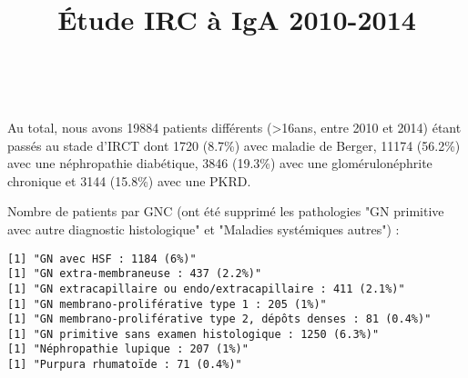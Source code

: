 \documentclass[11pt,a4paper]{article}\usepackage[]{graphicx}\usepackage[]{color}
\title{Étude IRC à IgA 2010-2014}
\makeatletter
\newenvironment{kframe}{%
 \def\at@end@of@kframe{}%
 \ifinner\ifhmode%
  \def\at@end@of@kframe{\end{minipage}}%
  \begin{minipage}{\columnwidth}%
 \fi\fi%
 \def\FrameCommand##1{\hskip\@totalleftmargin \hskip-\fboxsep
 \colorbox{shadecolor}{##1}\hskip-\fboxsep
     \hskip-\linewidth \hskip-\@totalleftmargin \hskip\columnwidth}%
 \MakeFramed {\advance\hsize-\width
   \@totalleftmargin\z@ \linewidth\hsize
   \@setminipage}}%
 {\par\unskip\endMakeFramed%
 \at@end@of@kframe}
\newenvironment{knitrout}{}{} %
\makeatother
\begin{document}
\maketitle

\tableofcontents
~\\





















\begin{knitrout}
\color{fgcolor}\begin{kframe}


{\ttfamily\noindent\bfseries{}}

{\ttfamily\noindent\bfseries{}}\end{kframe}
\end{knitrout}

Au total, nous avons 19884 patients différents (\textgreater 16ans, entre 2010 et 2014) étant passés au stade d'IRCT dont 1720 (8.7\%) avec maladie de Berger, 11174 (56.2\%) avec une néphropathie diabétique, 3846 (19.3\%) avec une glomérulonéphrite chronique et 3144 (15.8\%) avec une PKRD.

Nombre de patients par GNC (ont été supprimé les pathologies "GN primitive avec autre diagnostic histologique" et "Maladies systémiques autres") :

\begin{knitrout}
\color{fgcolor}\begin{kframe}
\begin{verbatim}
[1] "GN avec HSF : 1184 (6%)"
[1] "GN extra-membraneuse : 437 (2.2%)"
[1] "GN extracapillaire ou endo/extracapillaire : 411 (2.1%)"
[1] "GN membrano-proliférative type 1 : 205 (1%)"
[1] "GN membrano-proliférative type 2, dépôts denses : 81 (0.4%)"
[1] "GN primitive sans examen histologique : 1250 (6.3%)"
[1] "Néphropathie lupique : 207 (1%)"
[1] "Purpura rhumatoïde : 71 (0.4%)"
\end{verbatim}
\end{kframe}
\end{knitrout}
\end{document}
